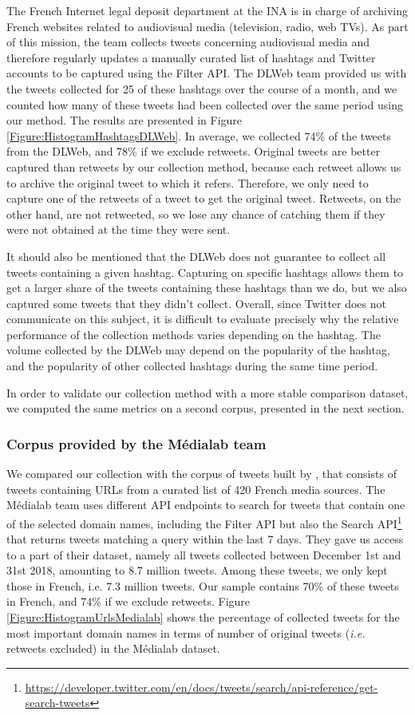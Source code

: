 The French Internet legal deposit department at the INA is in charge of archiving French websites related to audiovisual media (television, radio, web TVs). As part of this mission, the team collects tweets concerning audiovisual media and therefore regularly updates a manually curated list of hashtags and Twitter accounts to be captured using the Filter API. The DLWeb team provided us with the tweets collected for 25 of these hashtags over the course of a month, and we counted how many of these tweets had been collected over the same period using our method. The results are presented in Figure \ref{Figure:HistogramHashtagsDLWeb}. In average, we collected 74\% of the tweets from the DLWeb, and 78\% if we exclude retweets. Original tweets are better captured than retweets by our collection method, because each retweet allows us to archive the original tweet to which it refers. Therefore, we only need to capture one of the retweets of a tweet to get the original tweet. Retweets, on the other hand, are not retweeted, so we lose any chance of catching them if they were not obtained at the time they were sent.

It should also be mentioned that the DLWeb does not guarantee to collect all tweets containing a given hashtag. Capturing on specific hashtags allows them to get a larger share of the tweets containing these hashtags than we do, but we also captured some tweets that they didn't collect. Overall, since Twitter does not communicate on this subject, it is difficult to evaluate precisely why the relative performance of the collection methods varies depending on the hashtag. The volume collected by the DLWeb may depend on the popularity of the hashtag, and the popularity of other collected hashtags during the same time period. 

In order to validate our collection method with a more stable comparison dataset, we computed the same metrics on a second corpus, presented in the next section.

\subsubsection{Corpus provided by the Médialab team}
We compared our collection with the corpus of tweets built by \citet{cardon2019unfolding}, that consists of
tweets containing URLs from a curated list of 420 French media sources. The Médialab team uses different API endpoints to search for tweets that contain one of the selected domain names, including the Filter API but also the Search API\footnote{\url{https://developer.twitter.com/en/docs/tweets/search/api-reference/get-search-tweets}} that returns tweets matching a query within the last 7 days. They gave us access to a part of their dataset, namely all tweets collected between December 1st and 31st 2018, amounting to 8.7 million tweets. Among these tweets, we only kept those in French, i.e. 7.3 million tweets. Our sample contains 70\% of these tweets in French, and 74\% if we exclude retweets. Figure \ref{Figure:HistogramUrlsMedialab} shows the percentage of collected tweets for the most important domain names in terms of number of original tweets (\textit{i.e.} retweets excluded) in the Médialab dataset.

